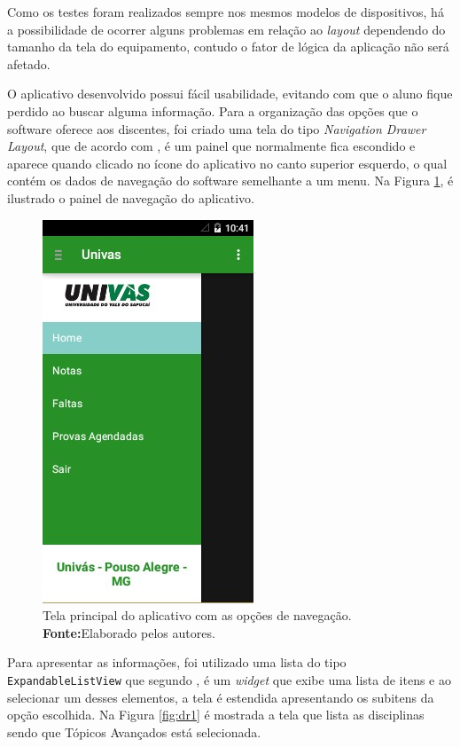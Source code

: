 	\par Como os testes foram realizados sempre nos mesmos modelos de dispositivos,
há a possibilidade de ocorrer alguns problemas em relação ao \textit{layout}
dependendo do tamanho da tela do equipamento, contudo o fator de lógica da
aplicação não será afetado.

	\par O aplicativo desenvolvido possui fácil usabilidade, evitando com que o
aluno fique perdido ao buscar alguma informação. Para a organização das opções
que o software oferece aos discentes, foi criado uma tela do tipo
\textit{Navigation Drawer Layout}, que de acordo com ,
é um painel que normalmente fica escondido e aparece quando clicado no ícone do
aplicativo no canto superior esquerdo, o qual contém os dados de navegação do
software semelhante a um menu. Na Figura \ref{fig:dr}, é ilustrado o painel de
navegação do aplicativo.
	 
\begin{figure}[h!]
	\centerline{\includegraphics[scale=0.8]{./imagens/3_discussao_resultados/dr.jpg}}
	\caption[Tela principal do aplicativo com as opções de navegação]{Tela
	principal do aplicativo com as opções de navegação.
	\textbf{Fonte:}Elaborado pelos autores.}
	\label{fig:dr}
\end{figure}

	\par Para apresentar as informações, foi utilizado uma lista do tipo
\texttt{ExpandableListView} que segundo , é um
\textit{widget} que exibe uma lista de itens e ao selecionar um desses
elementos, a tela é estendida apresentando os subitens da opção escolhida. Na
Figura \ref{fig:dr1} é mostrada a tela que lista as disciplinas sendo que
Tópicos Avançados está selecionada.



